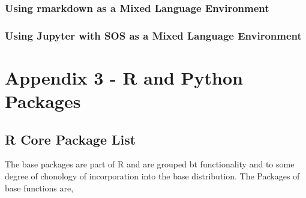 \documentclass[]{book}
\theoremstyle{definition}
\theoremstyle{definition}
\theoremstyle{definition}
\theoremstyle{remark}
\begin{document}
\subsection{Using rmarkdown as a Mixed Language
Environment}\label{using-rmarkdown-as-a-mixed-language-environment}

\subsection{Using Jupyter with SOS as a Mixed Language
Environment}\label{using-jupyter-with-sos-as-a-mixed-language-environment}

\chapter{Appendix 3 - R and Python
Packages}\label{appendix-3---r-and-python-packages}

\section{R Core Package List}\label{r-core-package-list}

The base packages are part of R and are grouped bt functionality and to
some degree of chonology of incorporation into the base distribution.
The Packages of base functions are,
\end{document}
